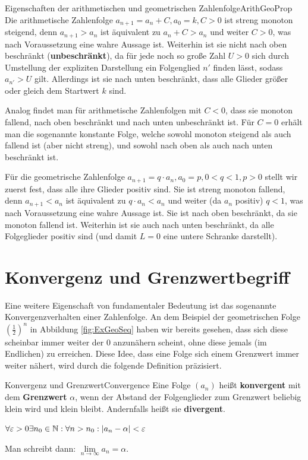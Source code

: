 \begin{example}{Eigenschaften der arithmetischen und geometrischen Zahlenfolge}{ArithGeoProp}
	Die arithmetische Zahlenfolge $a_{n+1} = a_n + C, a_0 = k, C > 0$ ist streng monoton steigend, denn $a_{n+1} > a_n$ ist äquivalent zu $a_n + C > a_n$ und weiter $C > 0$, was nach Voraussetzung eine wahre Aussage ist. Weiterhin ist sie nicht nach oben beschränkt (\textbf{unbeschränkt}), da für jede noch so große Zahl $U > 0$ sich durch Umstellung der expliziten Darstellung ein Folgenglied $n'$ finden lässt, sodass $a_{n'} > U$ gilt. Allerdings ist sie nach unten beschränkt, dass alle Glieder größer oder gleich dem Startwert $k$ sind.

	Analog findet man für arithmetische Zahlenfolgen mit $C<0$, dass sie monoton fallend, nach oben beschränkt und nach unten unbeschränkt ist. Für $C=0$ erhält man die sogenannte konstante Folge, welche sowohl monoton steigend als auch fallend ist (aber nicht streng), und sowohl nach oben als auch nach unten beschränkt ist.

	Für die geometrische Zahlenfolge $a_{n+1} = q \cdot a_n, a_0 = p, 0 < q < 1, p > 0$ stellt wir zuerst fest, dass alle ihre Glieder positiv sind. Sie ist streng monoton fallend, denn $a_{n+1} < a_n$ ist äquivalent zu $q \cdot a_n < a_n$ und weiter (da $a_n$ positiv) $q < 1$, was nach Voraussetzung eine wahre Aussage ist. Sie ist nach oben beschränkt, da sie monoton fallend ist. Weiterhin ist sie auch nach unten beschränkt, da alle Folgeglieder positiv sind (und damit $L=0$ eine untere Schranke darstellt).
\end{example}

\section{Konvergenz und Grenzwertbegriff}

Eine weitere Eigenschaft von fundamentaler Bedeutung ist das sogenannte Konvergenzverhalten einer Zahlenfolge. An dem Beispiel der geometrischen Folge $(\frac{1}{2})^n$ in Abbildung \ref{fig:ExGeoSeq} haben wir bereits gesehen, dass sich diese scheinbar immer weiter der $0$ anzunähern scheint, ohne diese jemals (im Endlichen) zu erreichen. Diese Idee, dass eine Folge sich einem Grenzwert immer weiter nähert, wird durch die folgende Definition präzisiert.

\begin{definition}{Konvergenz und Grenzwert}{Convergence}
	Eine Folge $(a_n)$ heißt \textbf{konvergent} mit dem \textbf{Grenzwert} $\alpha$, wenn der Abstand der Folgenglieder zum Grenzwert beliebig klein wird und klein bleibt. Andernfalls heißt sie \textbf{divergent}.

	$\forall \varepsilon > 0 \exists n_0\in\mathbb{N}: \forall n > n_0 : |a_n - \alpha| < \varepsilon$

	Man schreibt dann: $\lim\limits_{n\to\infty} a_n = \alpha$.
\end{definition}

